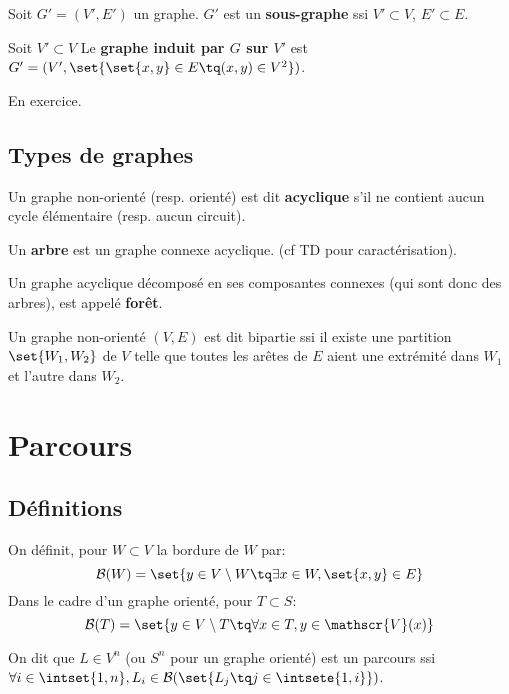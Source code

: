 \documentclass{scrartcl}
\begin{document}

			 Soit $G' = (V',E')$ un graphe.
			$G'$ est un \textbf{sous-graphe} ssi $V' \subset V$, $E' \subset E$.

			 Soit $V' \subset V$
			Le \textbf{graphe induit par $G$ sur $V'$} est $G' = (V', \set{\set{x,y}\in E \tq (x,y) \in V^2})$.

			\begin{demo}
				\item En exercice.
			\end{demo}
	
		\subsection{Types de graphes}
			 Un graphe non-orienté (resp. orienté) est dit \textbf{acyclique} s'il ne contient aucun cycle élémentaire (resp. aucun circuit).

			 Un \textbf{arbre} est un graphe connexe acyclique. (cf TD pour caractérisation).

			 Un graphe acyclique décomposé en ses composantes connexes (qui sont donc des arbres), est appelé \textbf{forêt}.

			 Un graphe non-orienté $(V,E)$ est dit bipartie ssi il existe une partition $\set{W_1,W_2}$ de $V$ telle que toutes les arêtes de $E$
			aient une extrémité dans $W_1$ et l'autre dans $W_2$.



	\section{Parcours}
		\subsection{Définitions}
			On définit, pour $W \subset V$ la bordure de $W$ par:
				\[ 
					\mathcal{B}(W) = 
					\set{ y \in V\setminus W \tq \exists x \in W, \set{x,y} \in E}
				\]
			Dans le cadre d'un graphe orienté, pour $T \subset S$:
				\[ 
					\mathcal{B}(T) = 
					\set{ y \in V\setminus T \tq \forall x \in T, y \in \mathscr{V}(x) }
				\]

			On dit que $L\in V^n$ (ou $S^n$ pour un graphe orienté) est un parcours ssi $\forall i \in \intset{1,n}, L_i \in \mathcal{B}(\set{L_j \tq j \in \intsete{1,i}})$.
			
\end{document}
